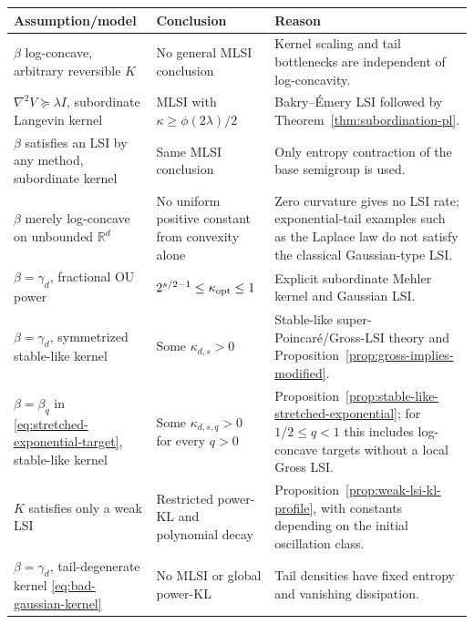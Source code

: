 \documentclass[11pt]{article}
\theoremstyle{definition}
\newcommand{\R}{\mathbb R}
\begin{document}
\begin{center}
\begin{tabular}{>{\raggedright\arraybackslash}p{.25\linewidth}
                >{\raggedright\arraybackslash}p{.28\linewidth}
                >{\raggedright\arraybackslash}p{.36\linewidth}}
\toprule
Assumption/model & Conclusion & Reason \\
\midrule
$\beta$ log-concave, arbitrary reversible $K$
& No general MLSI conclusion
& Kernel scaling and tail bottlenecks are independent of log-concavity. \\
\addlinespace
$\nabla^2V\succeq\lambda I$, subordinate Langevin kernel
& MLSI with $\kappa\geq\phi(2\lambda)/2$
& Bakry--\'Emery LSI followed by Theorem~\ref{thm:subordination-pl}. \\
\addlinespace
$\beta$ satisfies an LSI by any method, subordinate kernel
& Same MLSI conclusion
& Only entropy contraction of the base semigroup is used. \\
\addlinespace
$\beta$ merely log-concave on unbounded $\R^d$
& No uniform positive constant from convexity alone
& Zero curvature gives no LSI rate; exponential-tail examples such as the Laplace law do not satisfy the classical Gaussian-type LSI. \\
\addlinespace
$\beta=\gamma_d$, fractional OU power
& $2^{s/2-1}\leq\kappa_{\rm opt}\leq1$
& Explicit subordinate Mehler kernel and Gaussian LSI. \\
\addlinespace
$\beta=\gamma_d$, symmetrized stable-like kernel
& Some $\kappa_{d,s}>0$
& Stable-like super-Poincar\'e/Gross-LSI theory and Proposition~\ref{prop:gross-implies-modified}. \\
\addlinespace
$\beta=\beta_q$ in \eqref{eq:stretched-exponential-target}, stable-like kernel
& Some $\kappa_{d,s,q}>0$ for every $q>0$
& Proposition~\ref{prop:stable-like-stretched-exponential}; for $1/2\leq q<1$ this includes log-concave targets without a local Gross LSI. \\
\addlinespace
$K$ satisfies only a weak LSI
& Restricted power-KL and polynomial decay
& Proposition~\ref{prop:weak-lsi-kl-profile}, with constants depending on the initial oscillation class. \\
\addlinespace
$\beta=\gamma_d$, tail-degenerate kernel \eqref{eq:bad-gaussian-kernel}
& No MLSI or global power-KL
& Tail densities have fixed entropy and vanishing dissipation. \\
\bottomrule
\end{tabular}
\end{center}
\end{document}
